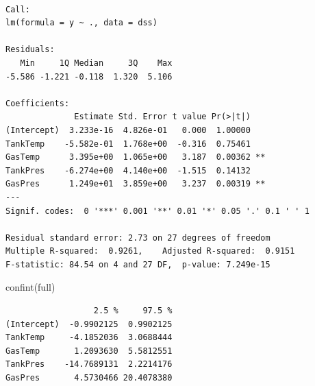 \documentclass[
  letterpaper,
  DIV=11,
  numbers=noendperiod]{scrartcl}
\newenvironment{Shaded}{\begin{snugshade}}{\end{snugshade}}
\newcommand{\AttributeTok}[1]{\textcolor[rgb]{0.40,0.45,0.13}{#1}}
\newcommand{\ConstantTok}[1]{\textcolor[rgb]{0.56,0.35,0.01}{#1}}
\newcommand{\DecValTok}[1]{\textcolor[rgb]{0.68,0.00,0.00}{#1}}
\newcommand{\FloatTok}[1]{\textcolor[rgb]{0.68,0.00,0.00}{#1}}
\newcommand{\FunctionTok}[1]{\textcolor[rgb]{0.28,0.35,0.67}{#1}}
\newcommand{\NormalTok}[1]{\textcolor[rgb]{0.00,0.23,0.31}{#1}}
\newcommand{\SpecialCharTok}[1]{\textcolor[rgb]{0.37,0.37,0.37}{#1}}
\newcommand{\StringTok}[1]{\textcolor[rgb]{0.13,0.47,0.30}{#1}}
\begin{document}
\begin{verbatim}

Call:
lm(formula = y ~ ., data = dss)

Residuals:
   Min     1Q Median     3Q    Max 
-5.586 -1.221 -0.118  1.320  5.106 

Coefficients:
              Estimate Std. Error t value Pr(>|t|)   
(Intercept)  3.233e-16  4.826e-01   0.000  1.00000   
TankTemp    -5.582e-01  1.768e+00  -0.316  0.75461   
GasTemp      3.395e+00  1.065e+00   3.187  0.00362 **
TankPres    -6.274e+00  4.140e+00  -1.515  0.14132   
GasPres      1.249e+01  3.859e+00   3.237  0.00319 **
---
Signif. codes:  0 '***' 0.001 '**' 0.01 '*' 0.05 '.' 0.1 ' ' 1

Residual standard error: 2.73 on 27 degrees of freedom
Multiple R-squared:  0.9261,    Adjusted R-squared:  0.9151 
F-statistic: 84.54 on 4 and 27 DF,  p-value: 7.249e-15
\end{verbatim}

\begin{Shaded}
\begin{Highlighting}[]
\FunctionTok{confint}\NormalTok{(full)}
\end{Highlighting}
\end{Shaded}

\begin{verbatim}
                  2.5 %     97.5 %
(Intercept)  -0.9902125  0.9902125
TankTemp     -4.1852036  3.0688444
GasTemp       1.2093630  5.5812551
TankPres    -14.7689131  2.2214176
GasPres       4.5730466 20.4078380
\end{verbatim}

\begin{Shaded}
\end{Shaded}
\end{document}
